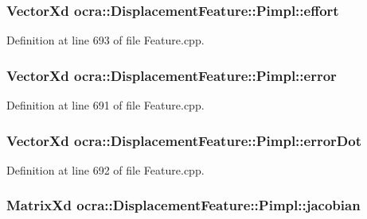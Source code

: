 \subsubsection[{\texorpdfstring{effort}{effort}}]{\setlength{\rightskip}{0pt plus 5cm}Vector\+Xd ocra\+::\+Displacement\+Feature\+::\+Pimpl\+::effort}\hypertarget{structocra_1_1DisplacementFeature_1_1Pimpl_a9df9dfcb9f2d59c1f09bd676c3589e7b}{}\label{structocra_1_1DisplacementFeature_1_1Pimpl_a9df9dfcb9f2d59c1f09bd676c3589e7b}


Definition at line 693 of file Feature.\+cpp.

\subsubsection[{\texorpdfstring{error}{error}}]{\setlength{\rightskip}{0pt plus 5cm}Vector\+Xd ocra\+::\+Displacement\+Feature\+::\+Pimpl\+::error}\hypertarget{structocra_1_1DisplacementFeature_1_1Pimpl_a98721661ee9190e726390f6049ffdf1b}{}\label{structocra_1_1DisplacementFeature_1_1Pimpl_a98721661ee9190e726390f6049ffdf1b}


Definition at line 691 of file Feature.\+cpp.

\subsubsection[{\texorpdfstring{error\+Dot}{errorDot}}]{\setlength{\rightskip}{0pt plus 5cm}Vector\+Xd ocra\+::\+Displacement\+Feature\+::\+Pimpl\+::error\+Dot}\hypertarget{structocra_1_1DisplacementFeature_1_1Pimpl_ad5d72a6e8baf66f182ff8ec61a74530a}{}\label{structocra_1_1DisplacementFeature_1_1Pimpl_ad5d72a6e8baf66f182ff8ec61a74530a}


Definition at line 692 of file Feature.\+cpp.

\subsubsection[{\texorpdfstring{jacobian}{jacobian}}]{\setlength{\rightskip}{0pt plus 5cm}Matrix\+Xd ocra\+::\+Displacement\+Feature\+::\+Pimpl\+::jacobian}\hypertarget{structocra_1_1DisplacementFeature_1_1Pimpl_a1dd31262d5e3fcec9850a03324754a8f}{}\label{structocra_1_1DisplacementFeature_1_1Pimpl_a1dd31262d5e3fcec9850a03324754a8f}


